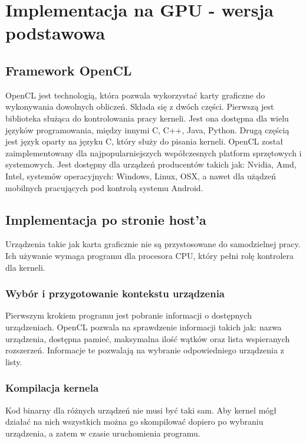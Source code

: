 
\section { Implementacja na GPU - wersja podstawowa }

\subsection{ Framework OpenCL }

OpenCL jest technologią, która pozwala wykorzystać karty graficzne do wykonywania dowolnych obliczeń. Składa się z dwóch części. Pierwszą jest biblioteka służąca do kontrolowania pracy kerneli. Jest ona dostępna dla wielu języków programowania, między innymi C, C++, Java, Python. Drugą częścią jest język oparty na języku C, który służy do pisania kerneli.
\linebreak
OpenCL został zaimplementowany dla najpopularniejszych współczesnych platform sprzętowych i systemowych. Jest dostępny dla urządzeń producentów takich jak: Nvidia, Amd, Intel, systemów operacyjnych: Windows, Linux, OSX, a nawet dla użądzeń mobilnych pracujących pod kontrolą systemu Android.

\subsection{ Implementacja po stronie host'a }

Urządzenia takie jak karta graficznie nie są przystosowane do samodzielnej pracy. Ich używanie wymaga programu dla procesora CPU, który pełni rolę kontrolera dla kerneli.

\subsubsection{ Wybór i przygotowanie kontekstu urządzenia }
Pierwszym krokiem programu jest pobranie informacji o dostępnych urządzeniach. OpenCL pozwala na sprawdzenie informacji takich jak: nazwa urządzenia, dostępna pamieć, maksymalna ilość wątków oraz lista wspieranych rozszerzeń. Informacje te pozwalają na wybranie odpowiedniego urządzenia z listy.

\subsubsection{ Kompilacja kernela }
Kod binarny dla różnych urządzeń nie musi być taki sam. Aby kernel mógł działać na nich wszystkich można go skompilować dopiero po wybraniu urządzenia, a zatem w czasie uruchomienia programu. 


